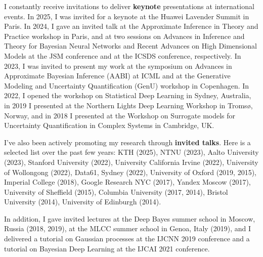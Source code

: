 \documentclass[oneside, a4paper, onecolumn, 10pt]{article}
\begin{document}
I constantly receive invitations to deliver {\bf keynote} presentations at international events.
In 2025, I was invited for a keynote at the Huawei Lavender Summit in Paris. 
In 2024, I gave an invited talk at the Approximate Inference in Theory and Practice workshop in Paris, and at two sessions on Advances in Inference and Theory for Bayesian Neural Networks and Recent Advances on High Dimensional Models at the JSM conference and at the ICSDS conference, respectively. 
In 2023, I was invited to present my work at the symposium on Advances in Approximate Bayesian Inference (AABI) at ICML and at the Generative Modeling and Uncertainty Quantification (GenU) workshop in Copenhagen. 
In 2022, I opened the workshop on Statistical Deep Learning in Sydney, Australia, in 2019 I presented at the Northern Lights Deep Learning Workshop in Troms\o, Norway, and in 2018 I presented at the Workshop on Surrogate models for Uncertainty Quantification in Complex Systems in Cambridge, UK.

I've also been actively promoting my research through {\bf invited talks}. 
Here is a selected list over the past few years:
KTH (2025), NTNU (2023), Aalto University (2023), Stanford University (2022), University California Irvine (2022), University of Wollongong (2022), Data61, Sydney (2022), University of Oxford (2019, 2015), Imperial College (2018), Google Research NYC (2017), Yandex Moscow (2017), University of Sheffield (2015), Columbia University (2017, 2014), Bristol University (2014), University of Edinburgh (2014). %

In addition, I gave invited lectures at the Deep Bayes summer school in Moscow, Russia (2018, 2019), at the MLCC summer school in Genoa, Italy (2019),
and I delivered a tutorial on Gaussian processes at the IJCNN 2019 conference and a tutorial on Bayesian Deep Learning at the IJCAI 2021 conference. 
\end{document}
